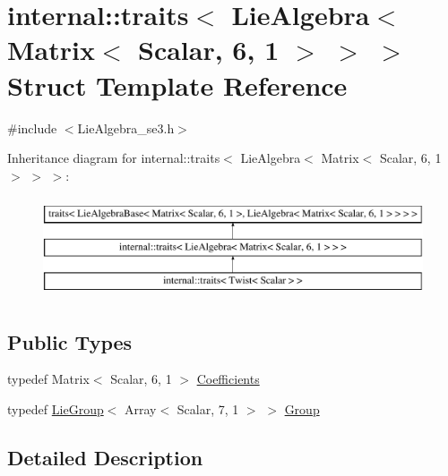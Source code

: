 \hypertarget{structinternal_1_1traits_3_01_lie_algebra_3_01_matrix_3_01_scalar_00_016_00_011_01_4_01_4_01_4}{}\section{internal\+:\+:traits$<$ Lie\+Algebra$<$ Matrix$<$ Scalar, 6, 1 $>$ $>$ $>$ Struct Template Reference}
\label{structinternal_1_1traits_3_01_lie_algebra_3_01_matrix_3_01_scalar_00_016_00_011_01_4_01_4_01_4}


{\ttfamily \#include $<$Lie\+Algebra\+\_\+se3.\+h$>$}

Inheritance diagram for internal\+:\+:traits$<$ Lie\+Algebra$<$ Matrix$<$ Scalar, 6, 1 $>$ $>$ $>$\+:\begin{figure}[H]
\begin{center}
\leavevmode
\includegraphics[height=3.000000cm]{structinternal_1_1traits_3_01_lie_algebra_3_01_matrix_3_01_scalar_00_016_00_011_01_4_01_4_01_4}
\end{center}
\end{figure}
\subsection*{Public Types}
\begin{DoxyCompactItemize}
\item 
typedef Matrix$<$ Scalar, 6, 1 $>$ \hyperlink{structinternal_1_1traits_3_01_lie_algebra_3_01_matrix_3_01_scalar_00_016_00_011_01_4_01_4_01_4_a24207cc49d00e538b9dac7329edc23e6}{Coefficients}
\item 
typedef \hyperlink{class_lie_group}{Lie\+Group}$<$ Array$<$ Scalar, 7, 1 $>$ $>$ \hyperlink{structinternal_1_1traits_3_01_lie_algebra_3_01_matrix_3_01_scalar_00_016_00_011_01_4_01_4_01_4_a2a6e55a56a1c0c3b97c50cb8598ac55a}{Group}
\end{DoxyCompactItemize}


\subsection{Detailed Description}
